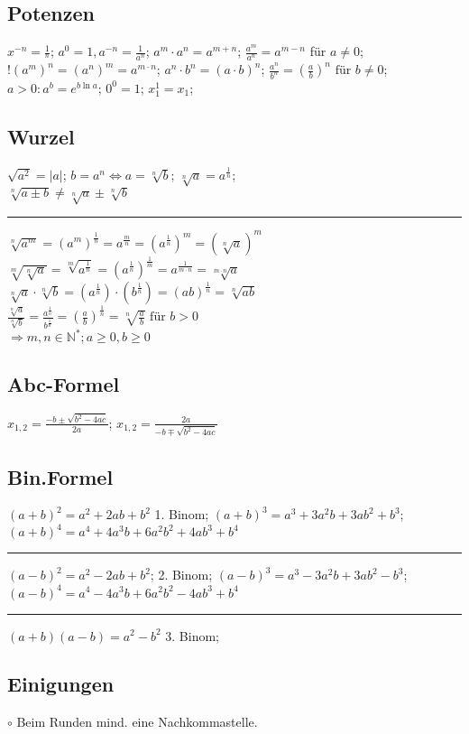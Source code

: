 \subsection{Potenzen}
$ x^{-n} = \frac{1}{^n} $; 
$ a^0 = 1, a^{-n} = \frac{1}{a^n} $; 
$ a^m \cdot a^n  = a^{m+n} $; 
$ \frac{a^m}{a^n} = a^{m-n} $ für $ a \ne 0 $; 
$ ! (a^m)^n = (a^n)^m = a^{m \cdot n} $; 
$ a^n \cdot b^n = (a \cdot b)^n $; 
$ \frac{a^n}{b^n} = (\frac{a}{b})^n \text{ für } b \ne  0 $; 
$ a >0 : a^b = e^{b \ln a} $; 
$ 0^0 = 1 $; 
$ x_{1}^1 = x_{1} $; 

\subsection{Wurzel}
$ \sqrt{a ^2} = |a| $;
$ b = a^n  \Leftrightarrow a = \sqrt[n]{b}$; 
$ \sqrt[n]{a} = a^{\frac{1}{n}} $; \\
$ \sqrt[n]{a \pm b} \ne \sqrt[n]{a} \pm \sqrt[n]{b} $ \\
\hrule
$ \sqrt[n]{a^m} = (a^m)^{\frac{1}{n}} = a^{\frac{m}{n}} = (a^\frac{1}{n})^m = (\sqrt[n]{a})^m $ \\
$\sqrt[m]{\sqrt[n]{a}} = \sqrt[m]{a^{\frac{1}{n}}} = (a^{\frac{1}{n}})^{\frac{1}{m}} = a^{\frac{1}{m \cdot n}} = \sqrt[m \cdot n ]{a} $\\
$ \sqrt[n]{a} \cdot \sqrt[n]{b} = (a^{\frac{1}{n}}) \cdot (b^{\frac{1}{n}})  = (ab)^{\frac{1}{n}} = \sqrt[n]{ab} $\\
$ \frac{\sqrt[n]{a}}{\sqrt[n]{b}} = \frac{a^{\frac{1}{n}}}{b^{\frac{1}{n}}} = (\frac{a}{b})^{\frac{1}{n}} = \sqrt[n]{\frac{a}{b}} \text{ für } b > 0 $\\
$\Rightarrow m , n \in \mathbb{N}^*; a \ge  0, b \ge 0 $
\subsection{Abc-Formel}
$ x_{1,2} = \frac{-b \pm \sqrt{b^2 - 4ac}}{2a} $; 
$ x_{1,2} = \frac{2a}{-b \mp \sqrt{b^2 -4ac}} $
\subsection{Bin.Formel}
$ (a + b)^2 = a^2 + 2ab + b^2 $ 1. Binom;
$ (a+b)^3 = a^3 + 3a^2b + 3ab^2 + b^3 $; 
$ (a+b)^4 = a^4 + 4a^3b + 6a^2b^2 + 4ab^3 + b^4$
\hrule
$ (a-b)^2 = a^2 - 2ab + b^2 $; 2. Binom;
$ (a-b)^3 = a^3 - 3a^2b + 3ab^2 - b^3$; 
$ (a-b)^4 = a^4 - 4a^3b + 6a^2b^2 - 4ab^3 + b^4 $
\hrule
$ (a+b) (a-b) = a^2 - b^2 $ 3. Binom; 

\subsection{Einigungen}
	$\circ$ Beim Runden mind. eine Nachkommastelle.
